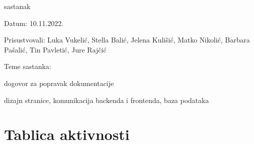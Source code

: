 \begin{packed_enum}
	   \item  sastanak
	   \item[] \begin{packed_item}
	   	\item Datum: 10.11.2022.
	   	\item Prisustvovali: Luka Vukelić, Stella Balić, Jelena Kulišić, Matko Nikolić, Barbara Pašalić, Tin Pavletić, Jure Rajčić
	   	\item Teme sastanka:
	   	\begin{packed_item}
	   		\item  dogovor za popravak dokumentacije
	   		\item  dizajn stranice, komunikacija backenda i frontenda, baza podataka
	   	\end{packed_item}
	   \end{packed_item}
			
			
		\end{packed_enum}
		
		\eject
		\section*{Tablica aktivnosti}

